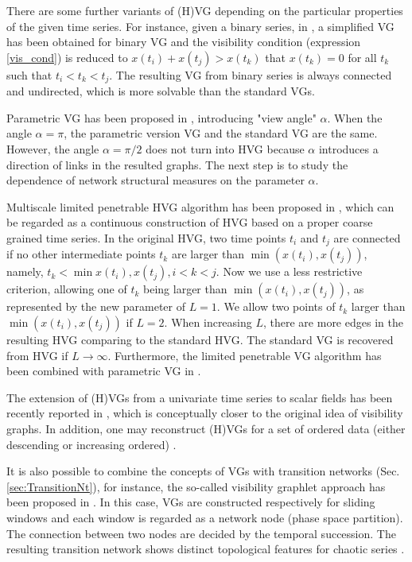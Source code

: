 		There are some further variants of (H)VG depending on the particular properties of the given time series. For instance, given a binary series, in \cite{Ahadpour2012}, a simplified VG has been obtained for binary VG and the visibility condition (expression \eqref{vis_cond}) is reduced to $x(t_i) + x(t_j) > x(t_k)$ that $x(t_k) = 0$ for all $t_k$ such that $t_i < t_k < t_j$. The resulting VG from binary series is always connected and undirected, which is more solvable than the standard VGs. 
		
		Parametric VG has been proposed in \cite{Bezsudnov2014,Snarskii2013a}, introducing "view angle" $\alpha$. When the angle $\alpha = \pi$, the parametric version VG and the standard VG are the same. However, the angle $\alpha = \pi / 2$ does not turn into HVG because $\alpha$ introduces a direction of links in the resulted graphs. The next step is to study the dependence of network structural measures on the parameter $\alpha$. 
		
		Multiscale limited penetrable HVG algorithm has been proposed in \cite{Gao2016,Pei2014a}, which can be regarded as a continuous construction of HVG based on a proper coarse grained time series. In the original HVG, two time points $t_i$ and $t_j$ are connected if no other intermediate points $t_k$ are larger than $\min{(x(t_i), x(t_j))}$, namely, $t_k < \min{x(t_i), x(t_j)}, i < k < j$. Now we use a less restrictive criterion, allowing one of $t_k$ being larger than $\min{(x(t_i), x(t_j))}$, as represented by the new parameter of $L=1$. We allow two points of $t_k$ larger than $\min{(x(t_i), x(t_j))}$ if $L = 2$. When increasing $L$, there are more edges in the resulting HVG comparing to the standard HVG. The standard VG is recovered from HVG if $L \to \infty$. Furthermore, the limited penetrable VG algorithm has been combined with parametric VG in \cite{Li2018}. 
				
		The extension of (H)VGs from a univariate time series to scalar fields has been recently reported in \cite{Xiao2014a,Lacasa2017}, which is conceptually closer to the original idea of visibility graphs. In addition, one may reconstruct (H)VGs for a set of ordered data (either descending or increasing ordered) \cite{Wang2015a}. 
						
		It is also possible to combine the concepts of VGs with transition networks (Sec. \ref{sec:TransitionNt}), for instance, the so-called visibility graphlet approach has been proposed in \cite{Mutua2015,Mutua2016a}. In this case, VGs are constructed respectively for sliding windows and each window is regarded as a network node (phase space partition). The connection between two nodes are decided by the temporal succession. The resulting transition network shows distinct topological features for chaotic series \cite{Mutua2016a}. 
		
